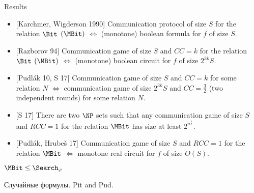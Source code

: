 \begin{frame}{Results}
    \begin{itemize}
        \item {[Karchmer, Wigderson 1990]} Communication protocol of size $S$ for the relation $\Bit$
            \alert{$(\MBit)$} $\Leftrightarrow$ \alert{(monotone)} boolean formula for $f$ of size $S$.
        \item {[Razborov 94]} Communication game of size $S$ and $CC = k$ for the relation $\Bit$
            \alert{$(\MBit)$} $\Leftrightarrow$ \alert{(monotone)} boolean circuit for $f$ of size
            $2^{3k} S$.
        \pause
        \item {[Pudl{\'{a}}k 10, S 17]} Communication game of size $S$ and $CC = k$ for some relation $N$
            $\Leftrightarrow$ communication game of size $2^{3k} S$ and $CC = \frac{3}{2}$ (two
            independent rounds) for some relation $N$.
    \end{itemize}
    
    \vspace{0.3cm}
    \pause
    \begin{itemize}                
        \item {[S 17]} There are two $\NP$ sets such that any communication game of size $S$ and $RCC = 1$
            for the relation $\MBit$ has size at least $2^{n^{\frac{1}{8}}}$.
        \pause    
        \item {[Pudl{\'{a}}k, Hrube{\v{s}} 17]} Communication game of size $S$ and $RCC = 1$ for the
            relation $\MBit$ $\Leftrightarrow$ monotone {\color{blue} real}
            circuit for $f$ of size $O(S)$.
    \end{itemize}
\end{frame}
    


\begin{frame}{$\MBit \le \Search_{\varphi}$}


\end{frame}


\begin{frame}

	Случайные формулы.  Pit and Pud.
\end{frame}